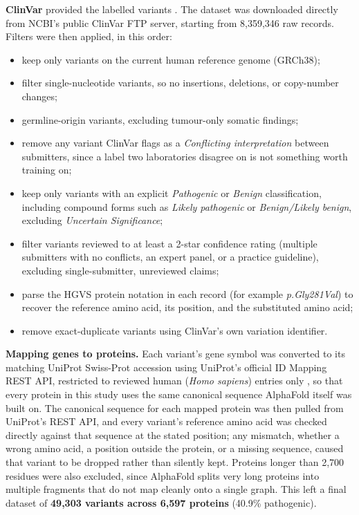 \documentclass[10pt,conference,a4paper]{IEEEtran}
\begin{document}
\textbf{ClinVar} provided the labelled variants \cite{landrum2018clinvar}. The dataset was downloaded directly from NCBI's public ClinVar FTP server, starting from 8,359,346 raw records. Filters were then applied, in this order:
\begin{itemize}
\item keep only variants on the current human reference genome (GRCh38);
\item filter single-nucleotide variants, so no insertions, deletions, or copy-number changes;
\item germline-origin variants, excluding tumour-only somatic findings;
\item remove any variant ClinVar flags as a \textit{Conflicting interpretation} between submitters, since a label two laboratories disagree on is not something worth training on;
\item keep only variants with an explicit \textit{Pathogenic} or \textit{Benign} classification, including compound forms such as \textit{Likely pathogenic} or \textit{Benign/Likely benign}, excluding \textit{Uncertain Significance};
\item filter variants reviewed to at least a 2-star confidence rating (multiple submitters with no conflicts, an expert panel, or a practice guideline), excluding single-submitter, unreviewed claims;
\item parse the HGVS protein notation in each record (for example \textit{p.Gly281Val}) to recover the reference amino acid, its position, and the substituted amino acid;
\item remove exact-duplicate variants using ClinVar's own variation identifier.
\end{itemize}

\textbf{Mapping genes to proteins.} Each variant's gene symbol was converted to its matching UniProt Swiss-Prot accession using UniProt's official ID Mapping REST API, restricted to reviewed human (\textit{Homo sapiens}) entries only \cite{uniprot2023}, so that every protein in this study uses the same canonical sequence AlphaFold itself was built on. The canonical sequence for each mapped protein was then pulled from UniProt's REST API, and every variant's reference amino acid was checked directly against that sequence at the stated position; any mismatch, whether a wrong amino acid, a position outside the protein, or a missing sequence, caused that variant to be dropped rather than silently kept. Proteins longer than 2{,}700 residues were also excluded, since AlphaFold splits very long proteins into multiple fragments that do not map cleanly onto a single graph. This left a final dataset of \textbf{49,303 variants across 6,597 proteins} (40.9\% pathogenic).
\end{document}
